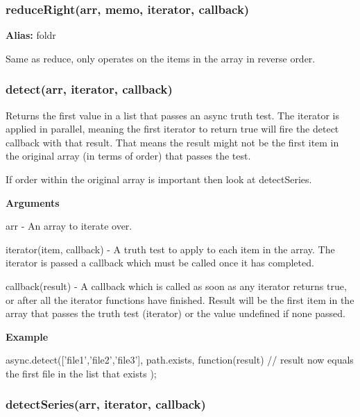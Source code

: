 \label{_reduceRight}%
 \subsubsection*{reduce\+Right(arr, memo, iterator, callback)}

{\bfseries Alias\+:} foldr

Same as reduce, only operates on the items in the array in reverse order.





\label{_detect}%
 \subsubsection*{detect(arr, iterator, callback)}

Returns the first value in a list that passes an async truth test. The iterator is applied in parallel, meaning the first iterator to return true will fire the detect callback with that result. That means the result might not be the first item in the original array (in terms of order) that passes the test.

If order within the original array is important then look at detect\+Series.

{\bfseries Arguments}


\begin{DoxyItemize}
\item arr -\/ An array to iterate over.
\item iterator(item, callback) -\/ A truth test to apply to each item in the array. The iterator is passed a callback which must be called once it has completed.
\item callback(result) -\/ A callback which is called as soon as any iterator returns true, or after all the iterator functions have finished. Result will be the first item in the array that passes the truth test (iterator) or the value undefined if none passed.
\end{DoxyItemize}

{\bfseries Example} \begin{DoxyVerb}async.detect(['file1','file2','file3'], path.exists, function(result){
    // result now equals the first file in the list that exists
});
\end{DoxyVerb}






\label{_detectSeries}%
 \subsubsection*{detect\+Series(arr, iterator, callback)}


